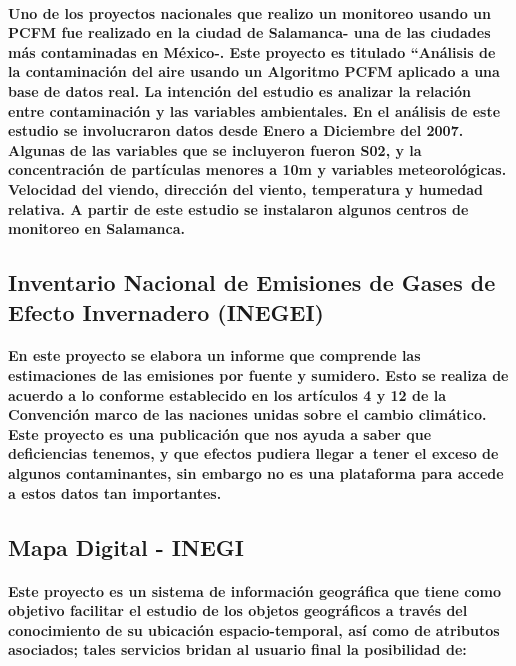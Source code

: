     \paragraph {Uno de los proyectos nacionales que realizo un monitoreo usando un PCFM fue realizado en la ciudad de Salamanca- una de las ciudades más contaminadas en México-.  Este proyecto es titulado “Análisis de la contaminación del aire usando un Algoritmo PCFM  aplicado a una base de datos real. La intención del estudio es analizar la relación entre contaminación y las variables ambientales. En el análisis de este estudio se involucraron datos desde Enero a Diciembre del 2007. Algunas de las variables que se incluyeron fueron S02, y la concentración de partículas menores a 10m y variables meteorológicas. Velocidad del viendo, dirección del viento, temperatura y humedad relativa. A partir de este estudio se instalaron algunos centros de monitoreo en Salamanca.}

    \subsection {Inventario Nacional de Emisiones de Gases de Efecto Invernadero (INEGEI)}
    \paragraph {En este proyecto se elabora un informe que comprende las estimaciones de las emisiones por fuente y sumidero. Esto se realiza de acuerdo a lo conforme establecido en los artículos 4 y 12 de la Convención marco de las naciones unidas sobre el cambio climático. Este proyecto es una publicación que nos ayuda a saber que deficiencias tenemos, y que efectos pudiera llegar a tener el exceso de algunos contaminantes, sin embargo no es una plataforma para accede a estos datos tan importantes.}

    \subsection {Mapa Digital -  INEGI}
    \paragraph {Este proyecto es un sistema de información geográfica que tiene como objetivo facilitar el estudio de los objetos geográficos a través del conocimiento de su ubicación espacio-temporal, así como de atributos asociados;  tales servicios bridan al usuario final la posibilidad de:}


